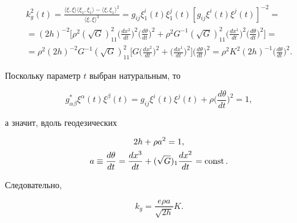 \begin{multline*} 


k^2_g(t)=\frac{\langle\xi,\xi \rangle 


\langle\xi_1,\xi_1 \rangle-\langle\xi,\xi_1 \rangle^2} 


{\langle\xi,\xi \rangle^3}=g_{i j}\xi^i_1(t)\xi^j_1(t) 


[g_{i j}\xi^i(t)\xi^j(t)]^{-2}= \\ 


% 


=(2h)^{-2}\bigg[\rho^2(\sqrt{G})^2_{11}\bigg( 


\frac{d x^2}{d t}\bigg)^2\bigg(\frac{d\theta}{d t} \bigg)^2+ 


\rho^2G^{-1}(\sqrt{G})^2_{11} 


\bigg(\frac{d x^1}{d t} \bigg)^2


\bigg(\frac{d\theta}{d t} \bigg)^2\bigg]= \\ 


% 


=\rho^2(2h)^{-2}G^{-1}(\sqrt{G})^2_{11}\bigg[G 


\bigg(\frac{d x^2}{d t} \bigg)^2+ 


\bigg(\frac{d x^1}{d t} \bigg)^2\bigg] 


\bigg(\frac{d\theta}{d t} \bigg)^2= 


\rho^2K^2(2h)^{-1}\bigg(\frac{d\theta}{d t} \bigg)^2. 


\end{multline*} 


Поскольку параметр $t$ выбран натуральным, то 


$$ 


g^*_{\alpha\beta}\xi^\alpha(t)\xi^\beta(t)= 


g_{i j}\xi^i(t)\xi^j(t)+\rho 


\bigg(\frac{d\theta}{d t} \bigg)^2=1, 


$$ 


а значит, вдоль геодезических 


\begin{gather} 


2h+\rho a^2=1, \\ 


a\equiv\frac{d\theta}{d t}=\frac{d x^3}{d t}+ 


(\sqrt{G})_1\frac{d x^2}{d t}=\const. 


\end{gather} 


Следовательно, 


\begin{equation} 


k_g=\frac{e\rho a}{\sqrt{2h}}K. 


\end{equation} 


